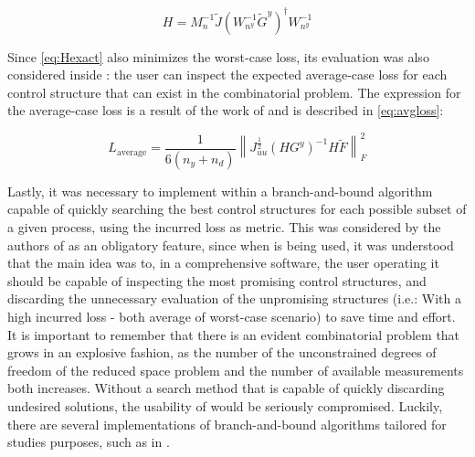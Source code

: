 \documentclass[../msc-thesis.tex]{subfiles}
\begin{document}
\begin{equation}
	H=M_{n}^{-1} \tilde{J}\left(W_{n^{y}}^{-1} \tilde{G}^{y}\right)^{\dagger} W_{n^{y}}^{-1}
	\label{eq:nullspace}
\end{equation}

Since \autoref{eq:Hexact} also minimizes the worst-case loss, its evaluation 
was also considered inside \mtc: the user can inspect the expected 
average-case loss for each control structure that can exist in the 
combinatorial problem. The expression for the average-case loss is a result of 
the work of \textcite{Kariwala2008} and is described in \autoref{eq:avgloss}:

\begin{equation}
	L_{\text {average}}=\frac{1}{6\left(n_{y}+n_{d}\right)}\left\|J_{u u}^{\frac{1}{2}}\left(H G^{y}\right)^{-1} H \widetilde{F}\right\|_{F}^{2}
	\label{eq:avgloss}
\end{equation}

Lastly, it was necessary to implement within \mtc a branch-and-bound algorithm 
capable of quickly searching the best control structures for each possible 
subset of a given process, using the incurred loss as metric. This was 
considered by the authors of \textcite{Alves2018} as an obligatory feature, 
since when \mtc is being used, it was understood that the main idea was to, 
in a comprehensive software, the user operating it should be capable of 
inspecting the most promising control structures, and discarding the 
unnecessary evaluation of the unpromising structures (i.e.: With a high 
incurred loss - both average of worst-case scenario) to save time and effort. 
It is important to remember that there is an evident combinatorial problem 
that grows in an explosive fashion, as the number of the unconstrained 
degrees of freedom of the reduced space problem and the number of available 
measurements both increases. Without a search method that is capable of 
quickly discarding undesired solutions, the usability of \mtc would be 
seriously compromised. Luckily, there are several implementations 
of branch-and-bound algorithms tailored for \soc studies purposes, such as 
in \textcite{Cao2005,Cao2008,Kariwala2009}.
\end{document}
